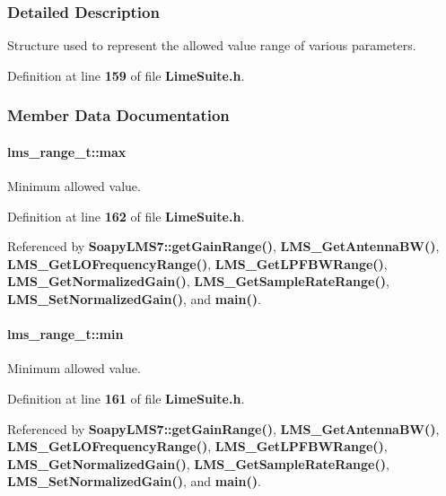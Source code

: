\subsubsection{Detailed Description}
Structure used to represent the allowed value range of various parameters. 

Definition at line {\bf 159} of file {\bf Lime\+Suite.\+h}.



\subsubsection{Member Data Documentation}
\paragraph[{max}]{ lms\+\_\+range\+\_\+t\+::max}\label{structlms__range__t_aef8d64f19e45d7a03fdc4e73a536c3ef}


Minimum allowed value. 



Definition at line {\bf 162} of file {\bf Lime\+Suite.\+h}.



Referenced by {\bf Soapy\+L\+M\+S7\+::get\+Gain\+Range()}, {\bf L\+M\+S\+\_\+\+Get\+Antenna\+B\+W()}, {\bf L\+M\+S\+\_\+\+Get\+L\+O\+Frequency\+Range()}, {\bf L\+M\+S\+\_\+\+Get\+L\+P\+F\+B\+W\+Range()}, {\bf L\+M\+S\+\_\+\+Get\+Normalized\+Gain()}, {\bf L\+M\+S\+\_\+\+Get\+Sample\+Rate\+Range()}, {\bf L\+M\+S\+\_\+\+Set\+Normalized\+Gain()}, and {\bf main()}.

\paragraph[{min}]{ lms\+\_\+range\+\_\+t\+::min}\label{structlms__range__t_a37284d4cd9791ea7d3126793b600be2b}


Minimum allowed value. 



Definition at line {\bf 161} of file {\bf Lime\+Suite.\+h}.



Referenced by {\bf Soapy\+L\+M\+S7\+::get\+Gain\+Range()}, {\bf L\+M\+S\+\_\+\+Get\+Antenna\+B\+W()}, {\bf L\+M\+S\+\_\+\+Get\+L\+O\+Frequency\+Range()}, {\bf L\+M\+S\+\_\+\+Get\+L\+P\+F\+B\+W\+Range()}, {\bf L\+M\+S\+\_\+\+Get\+Normalized\+Gain()}, {\bf L\+M\+S\+\_\+\+Get\+Sample\+Rate\+Range()}, {\bf L\+M\+S\+\_\+\+Set\+Normalized\+Gain()}, and {\bf main()}.

